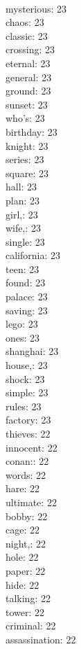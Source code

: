 \begin{multicols}{6}
  \\ mysterious: 23
  \\ chaos: 23
  \\ classic: 23
  \\ crossing: 23
  \\ eternal: 23
  \\ general: 23
  \\ ground: 23
  \\ sunset: 23
  \\ who's: 23
  \\ birthday: 23
  \\ knight: 23
  \\ series: 23
  \\ square: 23
  \\ hall: 23
  \\ plan: 23
  \\ girl,: 23
  \\ wife,: 23
  \\ single: 23
  \\ california: 23
  \\ teen: 23
  \\ found: 23
  \\ palace: 23
  \\ saving: 23
  \\ lego: 23
  \\ ones: 23
  \\ shanghai: 23
  \\ house,: 23
  \\ shock: 23
  \\ simple: 23
  \\ rules: 23
  \\ factory: 23
  \\ thieves: 22
  \\ innocent: 22
  \\ conan:: 22
  \\ words: 22
  \\ hare: 22
  \\ ultimate: 22
  \\ bobby: 22
  \\ cage: 22
  \\ night,: 22
  \\ hole: 22
  \\ paper: 22
  \\ hide: 22
  \\ talking: 22
  \\ tower: 22
  \\ criminal: 22
  \\ assassination: 22

\end{multicols}
